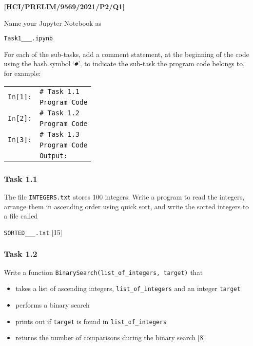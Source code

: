 \item \textbf{{[}HCI/PRELIM/9569/2021/P2/Q1{]}}

Name your Jupyter Notebook as 

\texttt{Task1\_<your name>\_<centre number>\_<index number>.ipynb} 

For each of the sub-tasks, add a comment statement, at the beginning
of the code using the hash symbol \textquoteleft \texttt{\#}\textquoteright ,
to indicate the sub-task the program code belongs to, for example:
\noindent \begin{center}
\begin{tabular}{c|l|}
\cline{2-2} 
\multirow{2}{*}{\texttt{In{[}1{]}:}} & \texttt{\# Task 1.1}\tabularnewline
 & \texttt{Program Code}\tabularnewline
\cline{2-2} 
\multirow{2}{*}{\texttt{In{[}2{]}:}} & \texttt{\# Task 1.2}\tabularnewline
 & \texttt{Program Code}\tabularnewline
\cline{2-2} 
\multirow{2}{*}{\texttt{In{[}3{]}:}} & \texttt{\# Task 1.3}\tabularnewline
 & \texttt{Program Code}\tabularnewline
\cline{2-2} 
\multicolumn{1}{c}{} & \multicolumn{1}{l}{\texttt{Output:}}\tabularnewline
\end{tabular}
\par\end{center}

\subsubsection*{Task 1.1 }

The file \texttt{INTEGERS.txt} stores 100 integers. Write a program
to read the integers, arrange them in ascending order using quick
sort, and write the sorted integers to a file called 

\texttt{SORTED\_<your name>\_<centre number>\_<index number>.txt}
\hfill{} {[}15{]}

\subsubsection*{Task 1.2 }

Write a function \texttt{BinarySearch(list\_of\_integers, target)}
that
\begin{itemize}
\item takes a list of ascending integers, \texttt{list\_of\_integers} and
an integer \texttt{target} 
\item performs a binary search 
\item prints out if \texttt{target} is found in \texttt{list\_of\_integers} 
\item returns the number of comparisons during the binary search \hfill{}
{[}8{]}
\end{itemize}

